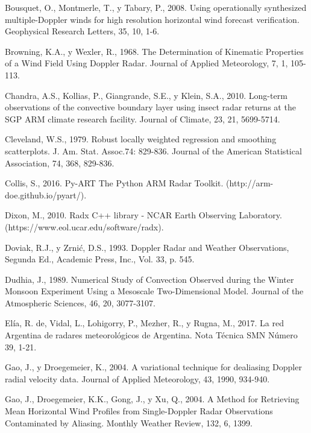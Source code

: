 \documentclass[12pt,spanish,oneside, a4paper]{book}
\begin{document}
\hypertarget{ref-Bousquet2008}{}
Bousquet, O., Montmerle, T., y Tabary, P., 2008. Using operationally
synthesized multiple-Doppler winds for high resolution horizontal wind
forecast verification. Geophysical Research Letters, 35, 10, 1-6.

\hypertarget{ref-Browning1968}{}
Browning, K.A., y Wexler, R., 1968. The Determination of Kinematic
Properties of a Wind Field Using Doppler Radar. Journal of Applied
Meteorology, 7, 1, 105-113.

\hypertarget{ref-Chandra2010}{}
Chandra, A.S., Kollias, P., Giangrande, S.E., y Klein, S.A., 2010.
Long-term observations of the convective boundary layer using insect
radar returns at the SGP ARM climate research facility. Journal of
Climate, 23, 21, 5699-5714.

\hypertarget{ref-Cleveland1979}{}
Cleveland, W.S., 1979. Robust locally weighted regression and smoothing
scatterplots. J. Am. Stat. Assoc.74: 829-836. Journal of the American
Statistical Association, 74, 368, 829-836.

\hypertarget{ref-Collis2016}{}
Collis, S., 2016. Py-ART The Python ARM Radar Toolkit.
(http://arm-doe.github.io/pyart/).

\hypertarget{ref-Dixon2010}{}
Dixon, M., 2010. Radx C++ library - NCAR Earth Observing Laboratory.
(https://www.eol.ucar.edu/software/radx).

\hypertarget{ref-Doviak1993}{}
Doviak, R.J., y Zrnić, D.S., 1993. Doppler Radar and Weather
Observations, Segunda Ed., Academic Press, Inc., Vol. 33, p. 545.

\hypertarget{ref-Dudhia1989}{}
Dudhia, J., 1989. Numerical Study of Convection Observed during the
Winter Monsoon Experiment Using a Mesoscale Two-Dimensional Model.
Journal of the Atmospheric Sciences, 46, 20, 3077-3107.

\hypertarget{ref-DeElia2017}{}
Elía, R. de, Vidal, L., Lohigorry, P., Mezher, R., y Rugna, M., 2017. La
red Argentina de radares meteorológicos de Argentina. Nota Técnica SMN
Número 39, 1-21.

\hypertarget{ref-Gao2004}{}
Gao, J., y Droegemeier, K., 2004. A variational technique for dealiasing
Doppler radial velocity data. Journal of Applied Meteorology, 43, 1990,
934-940.

\hypertarget{ref-Gao2004a}{}
Gao, J., Droegemeier, K.K., Gong, J., y Xu, Q., 2004. A Method for
Retrieving Mean Horizontal Wind Profiles from Single-Doppler Radar
Observations Contaminated by Aliasing. Monthly Weather Review, 132, 6,
1399.
\end{document}
